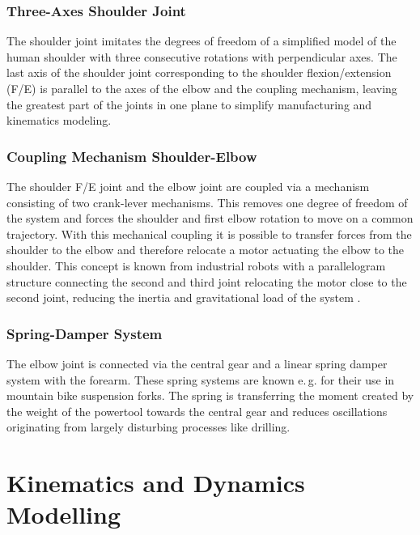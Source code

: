 \documentclass[twocolumn,10pt]{IFTOMM}
\begin{document}
\subsubsection{Three-Axes Shoulder Joint}
\label{sec:exo_des_shoulder}

The shoulder joint imitates the degrees of freedom of a simplified model of the human shoulder with three consecutive rotations with perpendicular axes.
The last axis of the shoulder joint corresponding to the shoulder flexion/extension (F/E) is parallel to the axes of the elbow and the coupling mechanism, leaving the greatest part of the joints in one plane to simplify manufacturing and kinematics modeling.

\subsubsection{Coupling Mechanism Shoulder-Elbow}
\label{sec:exo_des_secoupl}

The shoulder F/E joint and the elbow joint are coupled via a mechanism consisting of two crank-lever mechanisms.
This removes one degree of freedom of the system and forces the shoulder and first elbow rotation to move on a common trajectory.
With this mechanical coupling it is possible to transfer forces from the shoulder to the elbow and therefore relocate a motor actuating the elbow to the shoulder.
This concept is known from industrial robots with a parallelogram structure connecting the second and third joint relocating the motor close to the second joint, reducing the inertia and gravitational load of the system \cite{LuhZhe1985}.

\subsubsection{Spring-Damper System}
\label{sec:exo_des_sprdamp}

The elbow joint is connected via the central gear and a linear spring damper system with the forearm.
These spring systems are known e.\,g. for their use in mountain bike suspension forks.
The spring is transferring the moment created by the weight of the powertool towards the central gear and reduces oscillations originating from largely disturbing processes like drilling.

\section{Kinematics and Dynamics Modelling}
\label{sec:model}
\end{document}
